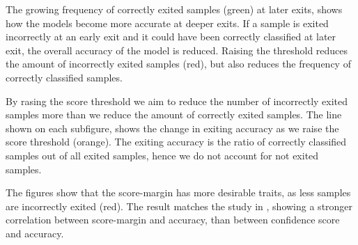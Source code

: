 The growing frequency of correctly exited samples ({\color{sns-green}green}) at later exits, shows how the models become more accurate at deeper exits. If a sample is exited incorrectly at an early exit and it could have been correctly classified at later exit, the overall accuracy of the model is reduced. Raising the threshold reduces the amount of incorrectly exited samples ({\color{sns-red}red}), but also reduces the frequency of correctly classified samples. 

By rasing the score threshold we aim to reduce the number of incorrectly exited samples more than we reduce the amount of correctly exited samples. The line shown on each subfigure, shows the change in exiting accuracy as we raise the score threshold ({\color{sns-orange}orange}). The exiting accuracy is the ratio of correctly classified samples out of all exited samples, hence we do not account for not exited samples. 

The figures show that the score-margin has more desirable traits, as less samples are incorrectly exited ({\color{sns-red}red}). The result matches the study in \cite{park_big/little_2015,tann_flexible_2018}, showing a stronger correlation between  score-margin and accuracy, than between confidence score and accuracy. 

